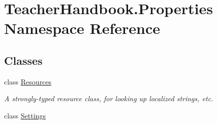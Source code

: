 \hypertarget{namespace_teacher_handbook_1_1_properties}{}\section{Teacher\+Handbook.\+Properties Namespace Reference}
\label{namespace_teacher_handbook_1_1_properties}
\subsection*{Classes}
\begin{DoxyCompactItemize}
\item 
class \mbox{\hyperlink{class_teacher_handbook_1_1_properties_1_1_resources}{Resources}}
\begin{DoxyCompactList}\small\item\em A strongly-\/typed resource class, for looking up localized strings, etc. \end{DoxyCompactList}\item 
class \mbox{\hyperlink{class_teacher_handbook_1_1_properties_1_1_settings}{Settings}}
\end{DoxyCompactItemize}
